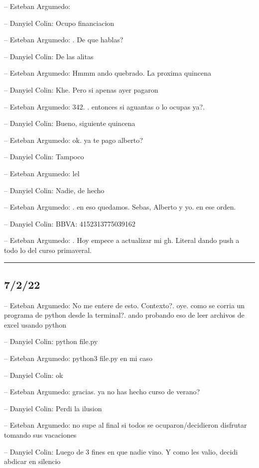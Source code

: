 -- Esteban Argumedo:

-- Danyiel Colin: Ocupo financiacion

-- Esteban Argumedo: . De que hablas?

-- Danyiel Colin: De las alitas

-- Esteban Argumedo: Hmmm ando quebrado. La proxima quincena

-- Danyiel Colin: Khe. Pero si apenas ayer pagaron

-- Esteban Argumedo: 342. . entonces si aguantas o lo ocupas ya?.

-- Danyiel Colin: Bueno, siguiente quincena

-- Esteban Argumedo: ok. ya te pago alberto?

-- Danyiel Colin: Tampoco

-- Esteban Argumedo: lel

-- Danyiel Colin: Nadie, de hecho

-- Esteban Argumedo: . en eso quedamos. Sebas, Alberto y yo. en ese
orden.

-- Danyiel Colin: BBVA: 4152313775039162

-- Esteban Argumedo: . Hoy empece a actualizar mi gh. Literal dando push
a todo lo del curso primaveral.

\begin{center}\rule{0.5\linewidth}{0.5pt}\end{center}

\hypertarget{section-115}{%
\subsection{7/2/22}\label{section-115}}

-- Esteban Argumedo: No me entere de esto. Contexto?. oye. como se
corria un programa de python desde la terminal?. ando probando eso de
leer archivos de excel usando python

-- Danyiel Colin: python file.py

-- Esteban Argumedo: python3 file.py en mi caso

-- Danyiel Colin: ok

-- Esteban Argumedo: gracias. ya no has hecho curso de verano?

-- Danyiel Colin: Perdi la ilusion

-- Esteban Argumedo: no supe al final si todos se ocuparon/decidieron
disfrutar tomando sus vacaciones

-- Danyiel Colin: Luego de 3 fines en que nadie vino. Y como les valio,
decidi abdicar en silencio

